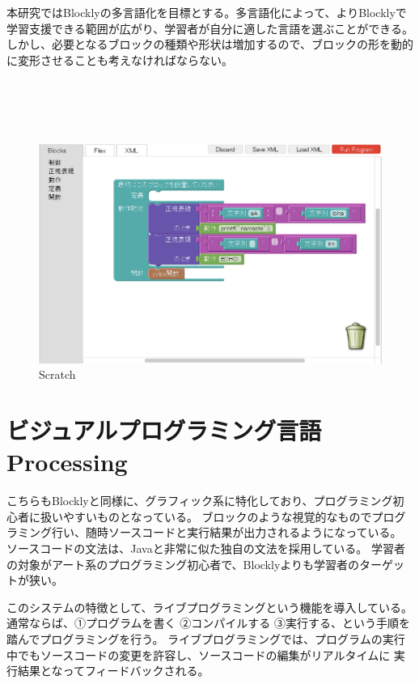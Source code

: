 \documentclass{eniepaper}
\begin{document}
本研究ではBlocklyの多言語化を目標とする。多言語化によって、よりBlocklyで学習支援できる範囲が広がり、学習者が自分に適した言語を選ぶことができる。しかし、必要となるブロックの種類や形状は増加するので、ブロックの形を動的に変形させることも考えなければならない。 
\\
\\
\\
\\
\\
\begin{figure}[h]
\begin{center}
\includegraphics[scale=0.3]{img/ozaki.eps}
\caption{Scratch}%
\label{fig:ozaki}
\end{center}%
\end{figure}%

\newpage

   \section{ビジュアルプログラミング言語 Processing}
   
こちらもBlocklyと同様に、グラフィック系に特化しており、プログラミング初心者に扱いやすいものとなっている。
 ブロックのような視覚的なものでプログラミング行い、随時ソースコードと実行結果が出力されるようになっている。
 ソースコードの文法は、Javaと非常に似た独自の文法を採用している。
 学習者の対象がアート系のプログラミング初心者で、Blocklyよりも学習者のターゲットが狭い。
 
 このシステムの特徴として、ライブプログラミングという機能を導入している。
 通常ならば、①プログラムを書く ②コンパイルする ③実行する、という手順を踏んでプログラミングを行う。
 ライブプログラミングでは、プログラムの実行中でもソースコードの変更を許容し、ソースコードの編集がリアルタイムに
 実行結果となってフィードバックされる。
 
\end{document}

